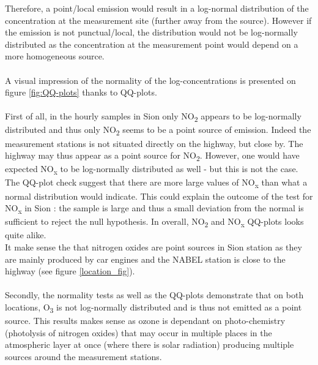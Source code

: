 \documentclass[a4paper, 12pt]{article}
\begin{document}
    Therefore, a point/local emission would result in a log-normal distribution of the concentration at the measurement site (further away from the source). However if the emission is not punctual/local, the distribution would not be log-normally distributed as the concentration at the measurement point would depend on a more homogeneous source. 
    \\
    \\
    A visual impression of the normality of the log-concentrations is presented on figure \ref{fig:QQ-plots} thanks to QQ-plots. \\
    \\ 
    First of all, in the hourly samples in Sion only NO\textsubscript{2} appears to be log-normally distributed and thus only NO\textsubscript{2} seems to be a point source of emission. Indeed the measurement stations is not situated directly on the highway, but close by. The highway may thus appear as a point source for NO\textsubscript{2}. However, one would have expected NO\textsubscript{x} to be log-normally distributed as well - but this is not the case. The QQ-plot check suggest that there are more large values of NO\textsubscript{x} than what a normal distribution would indicate. This could explain the outcome of the test for NO\textsubscript{x} in Sion : the sample is large and thus a small deviation from the normal is sufficient to reject the null hypothesis. In overall, NO\textsubscript{2} and NO\textsubscript{x} QQ-plots looks quite alike.
    \\
    It make sense the that nitrogen oxides are point sources in Sion station as they are mainly produced by car engines and the NABEL station is close to the highway (see figure \ref{location_fig}). 
    \\
    \\
    Secondly, the normality tests as well as the QQ-plots demonstrate that on both locations, O\textsubscript{3} is not log-normally distributed and is thus not emitted as a point source. This results makes sense as ozone is dependant on photo-chemistry (photolysis of nitrogen oxides) that may occur in multiple places in the atmospheric layer at once (where there is solar radiation) producing multiple sources around the measurement stations. 
    \\
    \\
\end{document}
